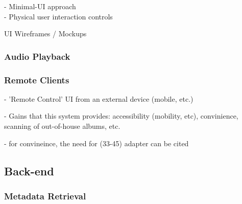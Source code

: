                 \begin{temp}
                    - Minimal-UI approach \\
                    - Physical user interaction controls
                \end{temp}
    
                \begin{temp}
                    UI Wireframes / Mockups
                \end{temp}
    
                
            
            \subsubsection{Audio Playback}
        
            \subsubsection{Remote Clients}
    
                \begin{temp}
                    - 'Remote Control' UI from an external device (mobile, etc.)
                    
                    - Gains that this system provides: accessibility (mobility, etc), convinience, scanning of out-of-house albums, etc.
    
                    - for convineince, the need for (33-45) adapter  can be cited
                \end{temp}
        
        \subsection{Back-end}
        
            \subsubsection{Metadata Retrieval}
          
